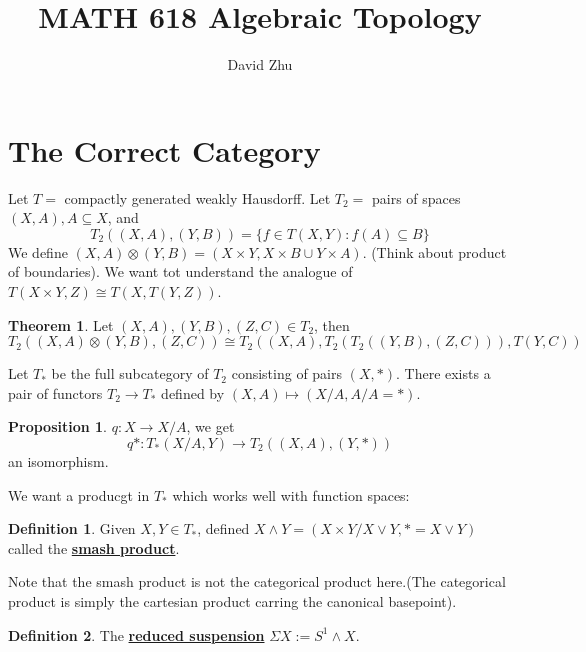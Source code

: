 \documentclass{article}
\title{MATH 618 Algebraic Topology}
\author{David Zhu}
\theoremstyle{definition}
\newtheorem{theorem}{Theorem}[section]
\theoremstyle{definition}
\newtheorem{definition}{Definition}[theorem]
\theoremstyle{definition}
\theoremstyle{definition}
\newtheorem{proposition}{Proposition}[theorem]
\theoremstyle{definition}
\theoremstyle{definition}
\theoremstyle{definition}
\begin{document}
\maketitle

\section{The Correct Category}
Let $T=$ compactly generated weakly Hausdorff. Let $T_2=$ pairs of spaces $(X,A), A\subseteq X$, and 
\[T_2((X,A),(Y,B))=\{ f\in T(X,Y): f(A)\subseteq B\}\]
We define $(X,A)\otimes (Y,B)=(X\times Y, X\times B\cup Y\times A)$. (Think about product of boundaries). We want tot understand the analogue of $T(X\times Y, Z)\cong T(X,T(Y,Z))$.


\begin{tcolorbox}[colback=red!5!white,colframe=red!30!white]
\begin{theorem}
Let $(X,A),(Y,B),(Z,C)\in T_2$, then 
\[T_2((X,A)\otimes (Y,B),(Z,C))\cong T_2((X,A), T_2(T_2((Y,B),(Z,C))), T(Y,C))\]
\end{theorem}
\end{tcolorbox}

Let $T_*$ be the full subcategory of $T_2$ consisting of pairs $(X,*)$. There exists a pair of functors $T_2\to T_*$ defined by $(X,A)\mapsto (X/A, A/A=*)$. 


\begin{tcolorbox}[colback=blue!5!white,colframe=blue!30!white]
\begin{proposition}
$q: X\to X/A$, we get 
\[q*: T_*(X/A,Y)\to T_2((X,A),(Y,*))\]
an isomorphism.
\end{proposition}
\end{tcolorbox}

We want a producgt in $T_*$ which works well with function spaces: 

\begin{tcolorbox}[colback=purple!5!white,colframe=purple!75!black]
\begin{definition}
Given $X,Y\in T_*$, defined $X\wedge Y=(X\times Y/X\vee Y, *=X\vee Y)$ called the \underline{\textbf{smash product}}.
\end{definition}
\end{tcolorbox}
Note that the smash product is not the categorical product here.(The categorical product is simply the cartesian product carring the canonical basepoint). 


\begin{tcolorbox}[colback=purple!5!white,colframe=purple!75!black]
\begin{definition}
The \underline{\textbf{reduced suspension}} $\Sigma X:=S^1\wedge X$. 
\end{definition}
\end{tcolorbox}
\end{document}
